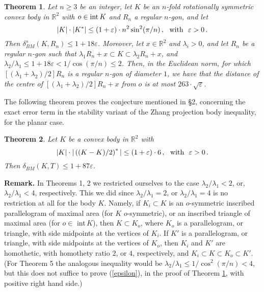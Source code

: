 \documentclass[12pt]{article}
\newtheorem{Thm}{Theorem}
\newcommand{\R}{\mathbb{R}}
\begin{document}

\begin{Thm}
\label{nfoldstab}
Let $n \ge 3$ be an integer, let $K$ be an $n$-fold 
rotationally symmetric convex body in $\R^2$ with $o \in 
{\text{\rm{int}}}\,K$ and $R_n$ a regular $n$-gon, 
and let
$$
|K|\cdot|K^*|\leq (1+\varepsilon)\cdot n^2\sin^2(\pi/n)\,, 
{\text{\,\,\,\,with\,\,\,\,}}
\varepsilon >0 \,.
$$
Then $\delta_{BM}^s (K,R_n)
\leq 1+18 \varepsilon $. Moreover, let
$x \in 
{\mathbb R}^2$ and $\lambda _i >0$, and let $R_n$ be 
a regular $n$-gon such that
$\lambda _1 R_n + x \subset K \subset \lambda _2 R_n + x$, and 
$\lambda _2 / \lambda _1 \le 1+18 \varepsilon < 1/\cos (\pi/ n) \le
2$. Then, in the Euclidean norm, for which
$[(\lambda _1 + \lambda _2)/2]R_n $ is a regular $n$-gon of diameter $1$, 
we have that the distance of the
centre of $[(\lambda _1 + \lambda _2)/2]R_n + x$ 
from $o$ is at most $263 \cdot \sqrt{ \varepsilon }$.
\end{Thm}


The following theorem proves the conjecture mentioned in \S 2, concerning
the exact error term in the stability variant of the Zhang projection body
inequality, for the planar case.


\begin{Thm}
\label{Egglestonstab}
Let $K$ be a convex body in $\R^2$ with
$$
|K| \cdot | \left( (K-K)/2 \right) ^*| \leq (1+\varepsilon)\cdot 6 \,,  
{\text{\,\,\,\,with\,\,\,\,}} \varepsilon >0 \,.
$$
Then $\delta_{BM}(K,T) \leq 1+87 \varepsilon $.
\end{Thm}


{\bf{Remark.}}
In Theorems 1, 2 we restricted ourselves to the case $\lambda _2 / \lambda _1
<2$, or, $\lambda _2 / \lambda _1 <4$, respectively. This we did since 
$\lambda _2 / \lambda _1 =2$, or $\lambda _2 / \lambda _1 =4$ is no restriction
at all for the body $K$. Namely, if $K_i \subset K$ is an $o$-symmetric
inscribed parallelogram of maximal area (for $K$ $o$-symmetric), or an
inscribed triangle of maximal area (for $o \in $ int\,$K$), 
then $K \subset K_o$, where $K_o$ is a
parallelogram, or triangle, with side midpoints at the vertices of $K_i$.
If $K'$ is a parallelogram, or triangle, with side midpoints at the vertices
of $K_o$, then $K_i$ and $K'$ are homothetic, with homothety ratio $2$, or $4$,
respectively, and $K_i \subset K \subset K_o \subset K'$. (For Theorem 5 the
analogous inequality would be $\lambda _2 / \lambda _1 \le 1/ \cos ^2 (\pi /n)
<4$, but this does not suffice to prove (\ref{epsilon}), 
in the proof of Theorem \ref{nfoldstab}, with positive right
hand side.)
\end{document}
